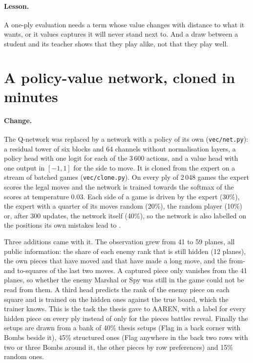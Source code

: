 \paragraph{Lesson.} A one-ply evaluation needs a term whose value changes with distance to what
it wants, or it values captures it will never stand next to. And a draw between a student and its
teacher shows that they play alike, not that they play well.

\section{A policy-value network, cloned in minutes}
\label{sec:pv-clone}

\paragraph{Change.} The Q-network was replaced by a network with a policy of its own
(\texttt{vec/net.py}): a residual tower of six blocks and 64 channels without normalisation
layers, a policy head with one logit for each of the 3\,600 actions, and a value head with one
output in $[-1, 1]$ for the side to move. It is cloned from the expert on a stream of batched
games (\texttt{vec/clone.py}). On every ply of 2\,048 games the expert scores the legal moves and
the network is trained towards the softmax of the scores at temperature 0.03. Each side of a game
is driven by the expert (30\%), the expert with a quarter of its moves random (20\%), the random
player (10\%) or, after 300 updates, the network itself (40\%), so the network is also labelled on
the positions its own mistakes lead to \cite{DAgger}.

Three additions came with it. The observation grew from 41 to 59 planes, all public information:
the share of each enemy rank that is still hidden (12 planes), the own pieces that have moved and
that have made a long move, and the from- and to-squares of the last two moves. A captured piece
only vanishes from the 41 planes, so whether the enemy Marshal or Spy was still in the game could
not be read from them. A third head predicts the rank of the enemy piece on each square and is
trained on the hidden ones against the true board, which the trainer knows. This is the task the
thesis gave to AAREN, with a label for every hidden piece on every ply instead of only for the
pieces battles reveal. Finally the setups are drawn from a bank of 40\% thesis setups (Flag in a
back corner with Bombs beside it), 45\% structured ones (Flag anywhere in the back two rows with
two or three Bombs around it, the other pieces by row preferences) and 15\% random ones.

